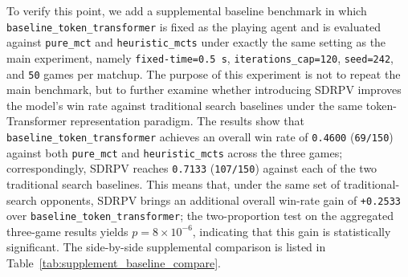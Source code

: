 To verify this point, we add a supplemental baseline benchmark in which \texttt{baseline_token_transformer} is fixed as the playing agent and is evaluated against \texttt{pure_mct} and \texttt{heuristic_mcts} under exactly the same setting as the main experiment, namely \texttt{fixed-time=0.5 s}, \texttt{iterations_cap=120}, \texttt{seed=242}, and \texttt{50} games per matchup. The purpose of this experiment is not to repeat the main benchmark, but to further examine whether introducing SDRPV improves the model's win rate against traditional search baselines under the same token-Transformer representation paradigm. The results show that \texttt{baseline_token_transformer} achieves an overall win rate of \texttt{0.4600} (\texttt{69/150}) against both \texttt{pure_mct} and \texttt{heuristic_mcts} across the three games; correspondingly, SDRPV reaches \texttt{0.7133} (\texttt{107/150}) against each of the two traditional search baselines. This means that, under the same set of traditional-search opponents, SDRPV brings an additional overall win-rate gain of \texttt{+0.2533} over \texttt{baseline_token_transformer}; the two-proportion test on the aggregated three-game results yields \texttt{$p=8\times10^{-6}$}, indicating that this gain is statistically significant.
The side-by-side supplemental comparison is listed in Table~\ref{tab:supplement_baseline_compare}.



